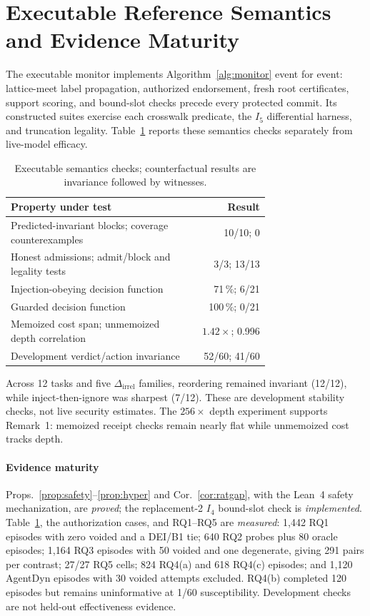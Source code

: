 \documentclass[conference,compsoc]{IEEEtran}
\theoremstyle{definition}
\theoremstyle{plain}
\newcommand{\Ifour}{\ensuremath{I_4}}
\newcommand{\Ifive}{\ensuremath{I_5}}
\newcommand{\Dirrel}{\ensuremath{\Delta_{\mathrm{irrel}}}}
\begin{document}
\section{Executable Reference Semantics and Evidence Maturity}
\label{app:refsem}
The executable monitor implements Algorithm~\ref{alg:monitor} event for
event: lattice-meet label propagation, authorized endorsement, fresh
root certificates, support scoring, and bound-slot checks precede every
protected commit. Its constructed suites exercise each crosswalk
predicate, the \Ifive{} differential harness, and truncation legality.
Table~\ref{tab:refsem} reports these semantics checks separately from
live-model efficacy.

\begin{table}[!htb]
\centering
\caption{Executable semantics checks; counterfactual results are
invariance followed by witnesses.}
\label{tab:refsem}
\scriptsize
\setlength{\tabcolsep}{3pt}
\renewcommand{\arraystretch}{0.94}
\begin{tabular}{@{}>{\raggedright\arraybackslash}p{0.72\linewidth} r@{}}
\toprule
Property under test & Result \\
\midrule
Predicted-invariant blocks; coverage counterexamples & 10/10; 0 \\
Honest admissions; admit/block and legality tests & 3/3; 13/13 \\
Injection-obeying decision function & 71\,\%; 6/21 \\
Guarded decision function & 100\,\%; 0/21 \\
Memoized cost span; unmemoized depth correlation & $1.42\times$; 0.996 \\
Development verdict/action invariance & 52/60; 41/60 \\
\bottomrule
\end{tabular}
\end{table}

Across 12 tasks and five $\Dirrel$ families, reordering remained
invariant (12/12), while inject-then-ignore was sharpest (7/12). These
are development stability checks, not live security estimates. The
$256\times$ depth experiment supports Remark~1: memoized receipt checks
remain nearly flat while unmemoized cost tracks depth.

\paragraph*{Evidence maturity}
Props.~\ref{prop:safety}--\ref{prop:hyper} and
Cor.~\ref{cor:ratgap}, with the Lean~4 safety mechanization, are
\emph{proved}; the replacement-2 \Ifour{} bound-slot check is
\emph{implemented}. Table~\ref{tab:refsem}, the authorization cases,
and RQ1--RQ5 are \emph{measured}: 1,442 RQ1 episodes with zero voided
and a DEI/B1 tie; 640 RQ2 probes plus 80 oracle episodes; 1,164 RQ3
episodes with 50 voided and one degenerate, giving 291 pairs per
contrast; 27/27 RQ5 cells; 824 RQ4(a) and 618 RQ4(c) episodes; and
1,120 AgentDyn episodes with 30 voided attempts excluded. RQ4(b)
completed 120 episodes but remains uninformative at 1/60
susceptibility. Development checks are not held-out effectiveness
evidence.
\end{document}

